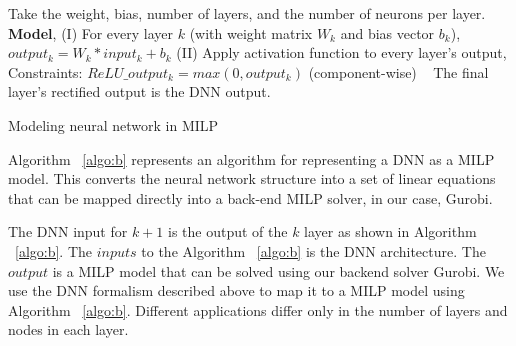 \begin{algorithm}
	Take the weight, bias, number of layers, and the number of neurons per layer. \\
	
	\textbf{Model}, \linebreak
	(I) For every layer $k$ (with weight matrix $W_k$ and bias vector $b_k$), $output_k = W_k * input_k + b_k$
	\linebreak
	(II) Apply activation function to every layer's output,
	\linebreak
	Constraints: $ReLU\_output_k = max(0, output_k)$ (component-wise) \
	\linebreak
	The final layer's rectified output is the DNN output.
	
	\caption{Modeling neural network in MILP}
	\label{algo:b}
\end{algorithm}


 Algorithm ~\ref{algo:b} represents an algorithm for representing a \ac{DNN} as a \ac{MILP} model. 
This converts the neural network structure into a set of linear equations that can be mapped directly into a back-end MILP solver, in our case, Gurobi. 

The DNN input for $k+1$ is the output of the $k$ layer as shown in Algorithm  ~\ref{algo:b}. 
The $inputs$ to the  Algorithm ~\ref{algo:b} is the \ac{DNN} architecture. 
The $output$ is a \ac{MILP} model that can be solved using our backend solver Gurobi. 
We use the \ac{DNN} formalism described above to map it to a \ac{MILP} model using Algorithm ~\ref{algo:b}.
Different applications differ only in the number of layers and nodes in each layer. 

